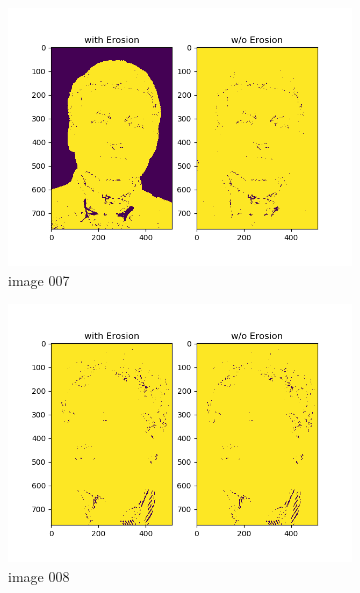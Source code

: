 \documentclass[11pt]{report}
\begin{document}
\begin{figure}[H]
\begin{subfigure}{0.3\textwidth}
        \includegraphics[width=\textwidth]{Task 2 Plots/skin_color_mask_erode_007.png}
        \caption{image 007}
        \label{fig:skin_colormask_erode7}
    \end{subfigure}
    \begin{subfigure}{0.3\textwidth}
        \centering
        \includegraphics[width=\textwidth]{Task 2 Plots/skin_color_mask_erode_008.png}
        \caption{image 008}
        \label{fig:skin_colormask_erode8}
    \end{subfigure}
    \begin{subfigure}{0.3\textwidth}
        \centering

\end{subfigure}
\end{figure}
\end{document}
